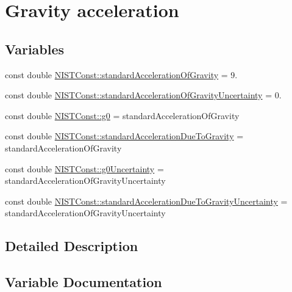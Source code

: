 \hypertarget{group___gravity_acceleration}{}\section{Gravity acceleration}
\label{group___gravity_acceleration}
\subsection*{Variables}
\begin{DoxyCompactItemize}
\item 
const double \hyperlink{group___gravity_acceleration_gad5bc5f7f030bc2c467a8430e00b42f5e}{N\+I\+S\+T\+Const\+::standard\+Acceleration\+Of\+Gravity} = 9.
\item 
const double \hyperlink{group___gravity_acceleration_gaabc6df92c25677a5b767445f101d4f57}{N\+I\+S\+T\+Const\+::standard\+Acceleration\+Of\+Gravity\+Uncertainty} = 0.
\item 
const double \hyperlink{group___gravity_acceleration_ga1fd0cec0a449e40eb603ac6292027924}{N\+I\+S\+T\+Const\+::g0} = standard\+Acceleration\+Of\+Gravity
\item 
const double \hyperlink{group___gravity_acceleration_ga7d417cb0027680e48ff481ab68a0864e}{N\+I\+S\+T\+Const\+::standard\+Acceleration\+Due\+To\+Gravity} = standard\+Acceleration\+Of\+Gravity
\item 
const double \hyperlink{group___gravity_acceleration_ga2d6c266044ae894212cef601eb974a0f}{N\+I\+S\+T\+Const\+::g0\+Uncertainty} = standard\+Acceleration\+Of\+Gravity\+Uncertainty
\item 
const double \hyperlink{group___gravity_acceleration_ga80a7a9469b199febff956dcbda1b5e1b}{N\+I\+S\+T\+Const\+::standard\+Acceleration\+Due\+To\+Gravity\+Uncertainty} = standard\+Acceleration\+Of\+Gravity\+Uncertainty
\end{DoxyCompactItemize}


\subsection{Detailed Description}


\subsection{Variable Documentation}
\mbox{\label{group___gravity_acceleration_ga1fd0cec0a449e40eb603ac6292027924}} 
